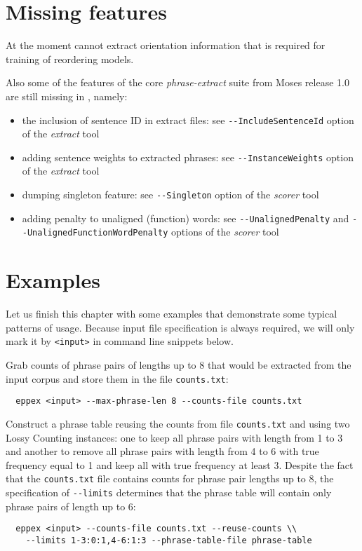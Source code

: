 \section{Missing features}

At the moment \eppex{} cannot extract orientation information that is required for training
of reordering models.

Also some of the features of the core \emph{phrase-extract} suite from Moses
release 1.0 are still missing in \eppex{}, namely:
\begin{itemize}
  \item the inclusion of sentence ID in extract files: see \verb|--IncludeSentenceId|
    option of the \emph{extract} tool
  \item adding sentence weights to extracted phrases: see \verb|--InstanceWeights|
    option of the \emph{extract} tool
  \item dumping singleton feature: see \verb|--Singleton| option of the \emph{scorer} tool
  \item adding penalty to unaligned (function) words: see \verb|--UnalignedPenalty|
    and \verb|--UnalignedFunctionWordPenalty| options of the \emph{scorer} tool
\end{itemize}

\section{Examples}

Let us finish this chapter with some examples that demonstrate some typical
patterns of \eppex{} usage. Because input file specification is always required,
we will only mark it by \verb|<input>| in command line snippets below.

Grab counts of phrase pairs of lengths up to 8 that would be extracted from
the input corpus and store them in the file \texttt{counts.txt}:
\begin{verbatim}
  eppex <input> --max-phrase-len 8 --counts-file counts.txt
\end{verbatim}

Construct a phrase table reusing the counts from file \texttt{counts.txt} and using
two Lossy Counting instances: one to keep all phrase pairs with length from
1 to 3 and another to remove all phrase pairs with length from 4 to 6 with true
frequency equal to 1 and keep all with true frequency at least 3. Despite the fact that
the \texttt{counts.txt} file contains counts for phrase pair lengths up to 8,
the specification of \verb|--limits| determines that the phrase table will contain
only phrase pairs of length up to 6:
\begin{verbatim}
  eppex <input> --counts-file counts.txt --reuse-counts \\
    --limits 1-3:0:1,4-6:1:3 --phrase-table-file phrase-table
\end{verbatim}

